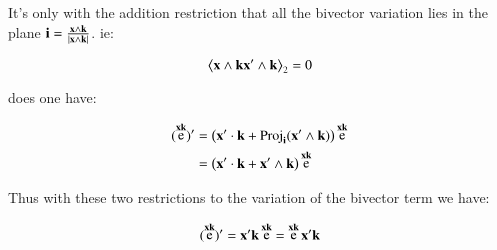 \documentclass{article}      %
\DeclareMathOperator{\Exp}{e}
\newcommand{\gpgrade}[2] {{\left\langle{{#1}}\right\rangle}_{#2}}
\newcommand{\gpgradetwo}[1] {\gpgrade{#1}{2}}
\begin{document}
It's only with the addition restriction that all the bivector variation lies in the plane $\mathbf{i} = \frac{\mathbf{x} \wedge \mathbf{k} }{ \lvert{\mathbf{x}\wedge \mathbf{k}}\rvert }$.  ie:

\[
\gpgradetwo{\Bx \wedge \Bk \Bx' \wedge \Bk} = 0
\]

does one have:

\begin{align*}
(\Exp^{\Bx\Bk})' 
&= \left(\Bx' \cdot \Bk + \Proj_{\Bi}(\Bx' \wedge \Bk) \right) \Exp^{\Bx\Bk} \\
&= \left(\Bx' \cdot \Bk + \Bx' \wedge \Bk \right) \Exp^{\Bx\Bk} \\
\end{align*}

Thus with these two restrictions to the variation of the bivector term we have:

\begin{equation}
(\Exp^{\Bx\Bk})' = \Bx'\Bk \Exp^{\Bx\Bk} = \Exp^{\Bx\Bk} \Bx'\Bk 
\end{equation}
\end{document}
